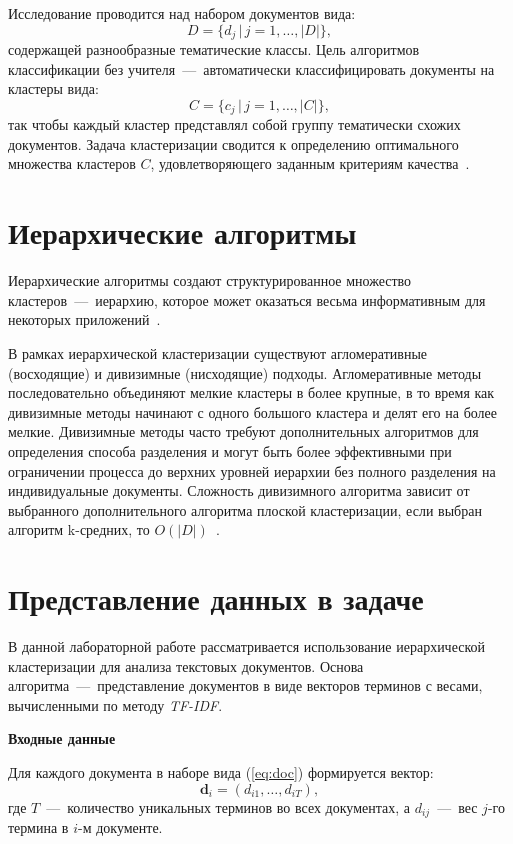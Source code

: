 Исследование проводится над набором документов вида:
\begin{equation}\label{eq:doc}
	D = \{d_j\,|\,j=1,\ldots,|D|\},
\end{equation}
содержащей разнообразные тематические классы.
Цель алгоритмов классификации без учителя~---~автоматически классифицировать документы на кластеры вида:
\begin{equation}\label{eq:claster}
	C = \{c_j\,|\,j=1,\ldots,|C|\},
\end{equation}
так чтобы каждый кластер представлял собой группу тематически схожих документов. 
Задача кластеризации сводится к определению оптимального множества кластеров \( C \), удовлетворяющего заданным критериям качества~\cite{main-book}.

\section{Иерархические алгоритмы}

Иерархические алгоритмы создают структурированное множество кластеров~---~иерархию, которое может оказаться весьма информативным для некоторых приложений~\cite{main-book}.

В рамках иерархической кластеризации существуют агломеративные (восходящие) и дивизимные (нисходящие) подходы. 
Агломеративные методы последовательно объединяют мелкие кластеры в более крупные, в то время как дивизимные методы начинают с одного большого кластера и делят его на более мелкие. 
Дивизимные методы часто требуют дополнительных алгоритмов для определения способа разделения и могут быть более эффективными при ограничении процесса до верхних уровней иерархии без полного разделения на индивидуальные документы.
Сложность дивизимного алгоритма зависит от выбранного дополнительного алгоритма плоской кластеризации, если выбран алгоритм k-средних, то $O(|D|)$~\cite{main-book}.

\section{Представление данных в задаче}

В данной лабораторной работе рассматривается использование иерархической кластеризации для анализа текстовых документов. 
Основа алгоритма~---~представление документов в виде векторов терминов с весами, вычисленными по методу \textit{TF-IDF}.

\textbf{Входные данные}

Для каждого документа в наборе вида (\ref{eq:doc}) формируется вектор:
\begin{equation}\label{eq:term}
\mathbf{d}_i = (d_{i1}, \ldots, d_{iT}), 
\end{equation}
где \( T \)~---~количество уникальных терминов во всех документах, а \( d_{ij} \)~---~вес  \( j \)-го термина в \( i \)-м документе.

